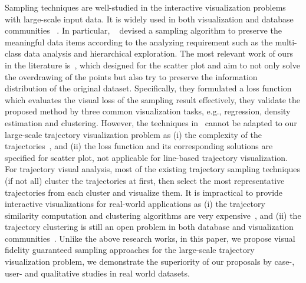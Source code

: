 Sampling techniques are well-studied in the interactive visualization problems with large-scale input data.
It is widely used in both visualization and database communities ~\cite{battle2013dynamic,chen2014visual,park2016visualization}.
In particular, ~\cite{chen2014visual} devised a sampling algorithm to preserve the meaningful data items according to the analyzing requirement such as the multi-class data analysis and hierarchical exploration.
The most relevant work of ours in the literature is~\cite{park2016visualization}, which designed for the scatter plot and aim to not only solve the overdrawing of the points but also try to preserve the information distribution of the original dataset.
Specifically, they formulated a loss function which evaluates the visual loss of the sampling result effectively,
they validate the proposed method by three common visualization tasks, e.g., regression, density estimation and clustering.
However, the techniques in~\cite{park2016visualization} cannot be adapted to our large-scale trajectory visualization problem
as (i) the complexity of the trajectories~\cite{pelekis2010unsupervised}, and (ii) the loss function and its corresponding solutions are specified for scatter plot, not applicable for line-based trajectory visualization.
For trajectory visual analysis,  most of the existing trajectory sampling techniques (if not all) cluster the trajectories at first,
then select the most representative trajectories from each cluster and visualize them.
It is impractical to provide interactive visualizations for real-world applications as
(i) the trajectory similarity computation and clustering algorithms are very expensive~\cite{pelekis2007similarity},
and (ii) the trajectory clustering is still an open problem in both database and visualization communities~\cite{panagiotakis2011segmentation,agarwal2018subtrajectory}.
Unlike the above research works, in this paper, we propose visual fidelity guaranteed sampling approaches for the large-scale trajectory visualization problem,
we demonstrate the superiority of our proposals by case-, user- and qualitative studies in real world datasets.






